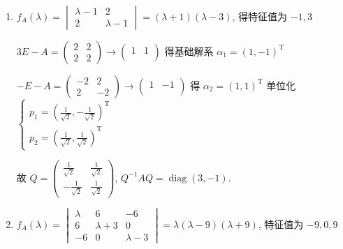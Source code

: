      \paragraph{} %
         \begin{enumerate}
             \item %
                   \( f_{A}(\lambda) = \begin{vmatrix}
                       \lambda-1 & 2         \\
                       2         & \lambda-1
                   \end{vmatrix} = (\lambda+1)(\lambda-3) \), 得特征值为 \( -1, 3 \)

                   \( 3E-A = \begin{pmatrix}
                       2 & 2 \\
                       2 & 2
                   \end{pmatrix} \rightarrow \begin{pmatrix}
                       1 & 1 \\
                         &
                   \end{pmatrix} \) 得基础解系 \( \alpha_{1} = (1, -1)^{\mathrm{T}} \)

                   \( -E-A = \begin{pmatrix}
                       -2 & 2  \\
                       2  & -2
                   \end{pmatrix} \rightarrow \begin{pmatrix}
                       1 & -1 \\
                         &
                   \end{pmatrix} \) 得 \( \alpha_{2} = (1, 1)^{\mathrm{T}} \) 单位化 \( \begin{cases}
                       p_{1} = \left( \frac{1}{\sqrt{2}}, -\frac{1}{\sqrt{2}} \right)^{\mathrm{T}} \\
                       p_{2} = \left( \frac{1}{\sqrt{2}}, \frac{1}{\sqrt{2}} \right)^{\mathrm{T}}
                   \end{cases} \)

                   故 \( Q = \begin{pmatrix}
                       \frac{1}{\sqrt{2}}  & \frac{1}{\sqrt{2}} \\
                       -\frac{1}{\sqrt{2}} & \frac{1}{\sqrt{2}}
                   \end{pmatrix} \), \( Q^{-1}AQ = \operatorname{diag}(3, -1) \).
             \item %
                   \( f_{A}(\lambda) = \begin{vmatrix}
                       \lambda & 6         & -6        \\
                       6       & \lambda+3 & 0         \\
                       -6      & 0         & \lambda-3
                   \end{vmatrix} = \lambda(\lambda-9)(\lambda+9) \), 特征值为 \( -9, 0, 9 \)


\end{enumerate}
